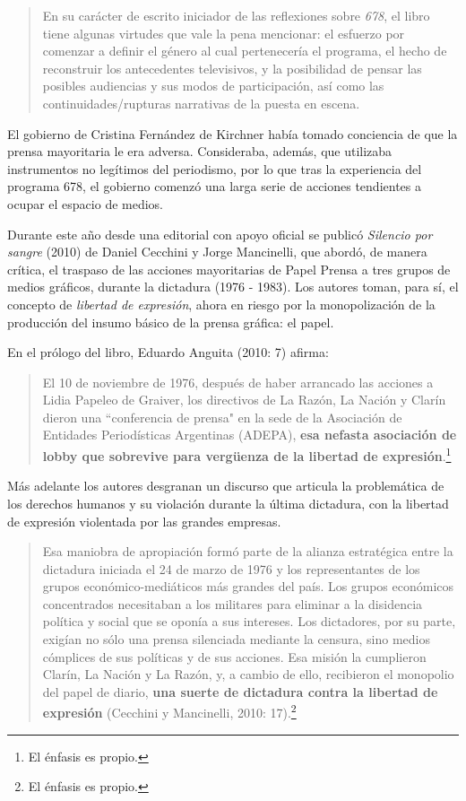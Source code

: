 \begin{quote}
En su carácter de escrito iniciador de las reflexiones sobre \emph{678}, el libro tiene algunas virtudes que vale la pena mencionar: el esfuerzo por comenzar a definir el género al cual pertenecería el programa, el hecho de reconstruir los antecedentes televisivos, y la posibilidad de pensar las posibles audiencias y sus modos de participación, así como las continuidades/rupturas narrativas de la puesta en escena.
\end{quote}

El gobierno de Cristina Fernández de Kirchner había tomado conciencia de que la prensa mayoritaria le era adversa. Consideraba, además, que utilizaba instrumentos no legítimos del periodismo, por lo que tras la experiencia del programa 678, el gobierno comenzó una larga serie de acciones tendientes a ocupar el espacio de medios.

Durante este año desde una editorial con apoyo oficial se publicó \emph{Silencio por sangre} (2010) de Daniel Cecchini y Jorge Mancinelli, que abordó, de manera crítica, el traspaso de las acciones mayoritarias de Papel Prensa a tres grupos de medios gráficos, durante la dictadura (1976 - 1983). Los autores toman, para sí, el concepto de \emph{libertad de expresión}, ahora en riesgo por la monopolización de la producción del insumo básico de la prensa gráfica: el papel.

En el prólogo del libro, Eduardo Anguita (2010: 7) afirma:

\begin{quote}
El 10 de noviembre de 1976, después de haber arrancado las acciones a Lidia Papeleo de Graiver, los directivos de La Razón, La Nación y Clarín dieron una ``conferencia de prensa" en la sede de la Asociación de Entidades Periodísticas Argentinas (ADEPA), \textbf{esa nefasta asociación de lobby que sobrevive para vergüenza de la libertad de expresión}.\footnote{El énfasis es propio.}
\end{quote}

Más adelante los autores desgranan un discurso que articula la problemática de los derechos humanos y su violación durante la última dictadura, con la libertad de expresión violentada por las grandes empresas.

\begin{quote}
Esa maniobra de apropiación formó parte de la alianza estratégica entre la dictadura iniciada el 24 de marzo de 1976 y los representantes de los grupos económico-mediáticos más grandes del país. Los grupos económicos concentrados necesitaban a los militares para eliminar a la disidencia política y social que se oponía a sus intereses. Los dictadores, por su parte, exigían no sólo una prensa silenciada mediante la censura, sino medios cómplices de sus políticas y de sus acciones. Esa misión la cumplieron Clarín, La Nación y La Razón, y, a cambio de ello, recibieron el monopolio del papel de diario, \textbf{una suerte de dictadura contra la libertad de expresión} (Cecchini y Mancinelli, 2010: 17).\footnote{El énfasis es propio.}
\end{quote}

